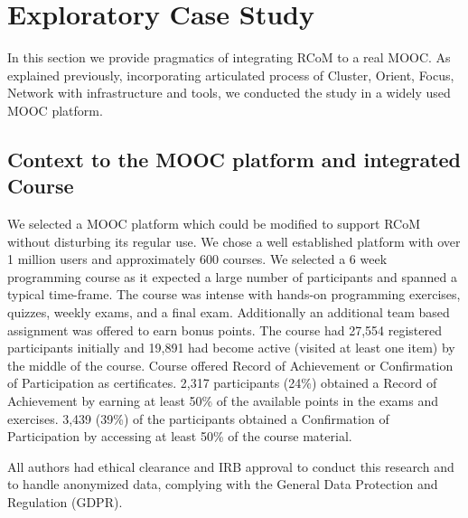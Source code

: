 \documentclass[format=acmsmall, review=false, screen=true]{acmart}
\begin{document}

\section{Exploratory Case Study}
In this section we provide pragmatics of integrating RCoM to a real MOOC. As explained previously, incorporating articulated process of Cluster, Orient, Focus, Network with infrastructure and tools, we conducted the study in a widely used MOOC platform. 

\subsection{Context to the MOOC platform and integrated Course}
We selected a MOOC platform which could be modified to support RCoM without disturbing its regular use. We chose a well established platform with over 1 million users and approximately 600 courses. We selected a 6 week programming course as it expected a large number of participants and spanned a typical time-frame. The course was intense with hands-on programming exercises, quizzes, weekly exams, and a final exam. Additionally an additional team based assignment was offered to earn bonus points. The course had 27,554 registered participants initially and 19,891 had become active (visited at least one item) by the middle of the course. Course offered Record of Achievement or Confirmation of Participation as certificates. 2,317 participants (24\%) obtained a Record of Achievement by earning at least 50\% of the available points in the exams and exercises. 3,439 (39\%) of the participants obtained a Confirmation of Participation by accessing at least 50\% of the course material. 

All authors had ethical clearance and IRB approval to conduct this research and to handle anonymized data, complying with the General Data Protection and Regulation (GDPR). 
\end{document}
